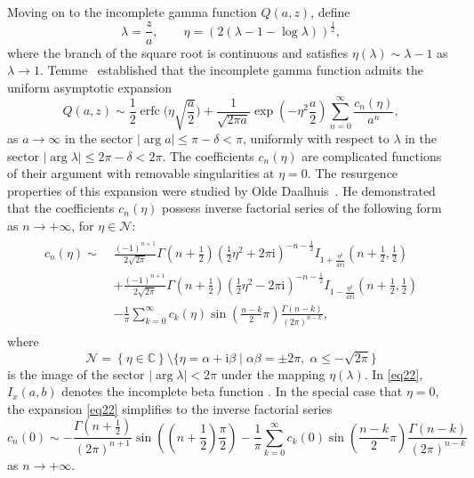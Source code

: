 \documentclass[11pt]{article}
\numberwithin{equation}{section}
\def\im{\mathrm{i}}
\def\erfc{\operatorname{erfc}}
\numberwithin{equation}{section}
\begin{document}
Moving on to the incomplete gamma function $Q(a,z)$, define
\[
\lambda = \frac{z}{a},\qquad \eta = (2(\lambda - 1 - \log \lambda ))^{\frac{1}{2}} ,
\]
where the branch of the square root is continuous and satisfies $\eta(\lambda)\sim \lambda-1$ as $\lambda\to 1$. Temme~\cite{Temme1979} established that the incomplete gamma function admits the uniform asymptotic expansion
\begin{equation}\label{eq23}
Q(a,z) \sim \frac{1}{2}\erfc\bigg( \eta \sqrt{\frac{a}{2}} \bigg) + \frac{1}{\sqrt{2\pi a} }\exp \left(- \eta ^2 \frac{a}{2}\right)\sum_{n = 0}^\infty \frac{c_n (\eta )}{a^n},
\end{equation}
as $a\to \infty$ in the sector $|\arg a| \le \pi-\delta<\pi$, uniformly with respect to $\lambda$ in the sector $|\arg \lambda| \le 2\pi-\delta<2\pi$. The coefficients $c_n (\eta )$ are complicated functions of their argument with removable singularities at $\eta=0$. The resurgence properties of this expansion were studied by Olde Daalhuis~\cite{OldeDaalhuis1998a}. He demonstrated that the coefficients $c_n (\eta)$ possess inverse factorial series of the following form as $n\to+\infty$, for $\eta \in \mathcal{N}$:
\begin{gather}\label{eq22}
\begin{split}
c_n (\eta ) \sim \; & \frac{( - 1)^{n + 1} }{2\sqrt {2\pi }}\Gamma \left( n + \frac{1}{2} \right)\left( \frac{1}{2}\eta ^2 + 2\pi \im \right)^{ - n - \frac{1}{2}} I_{1 + \frac{\eta ^2 }{4\pi \im}} \left( n + \frac{1}{2},\frac{1}{2} \right)
\\ & + \frac{( - 1)^{n + 1} }{2\sqrt {2\pi } }\Gamma \left( n + \frac{1}{2} \right)\left( \frac{1}{2}\eta ^2 - 2\pi \im \right)^{ - n - \frac{1}{2}} I_{1 - \frac{\eta ^2 }{4\pi \im}} \left( n + \frac{1}{2},\frac{1}{2} \right)
\\ & - \frac{1}{\pi}\sum_{k = 0}^\infty c_k (\eta )\sin \left( \frac{n - k}{2}\pi \right)\frac{\Gamma (n - k)}{(2\pi )^{n - k} },
\end{split}
\end{gather}
where
\[
\mathcal{N} = \left\{ \eta \in \mathbb{C} \right\}\setminus \big\{ \eta = \alpha + \im \beta \mid \alpha \beta = \pm 2\pi ,\; \alpha \le - \sqrt {2\pi}\big\}
\]
is the image of the sector $|\arg \lambda|<2\pi$ under the mapping $\eta(\lambda)$. In \eqref{eq22}, $I_x(a,b)$ denotes the incomplete beta function \cite[Section~8.17]{DLMF}. In the special case that $\eta=0$, the expansion \eqref{eq22} simplifies to the inverse factorial series
\begin{equation}\label{eq19}
c_n (0) \sim -\frac{\Gamma \left( n + \frac{1}{2} \right)}{(2\pi )^{n + 1}}\sin\left( \left( n + \frac{1}{2} \right)\frac{\pi}{2} \right) - \frac{1}{\pi}\sum_{k = 0}^\infty c_k (0)\sin \left( \frac{n - k}{2}\pi \right)\frac{\Gamma (n - k)}{(2\pi )^{n - k} }
\end{equation}
as $n\to+\infty$.
\end{document}
